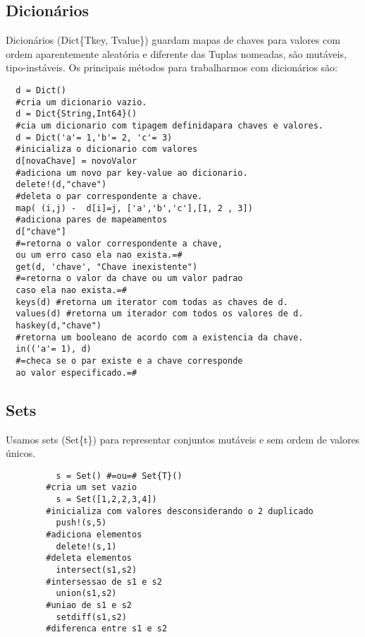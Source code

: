 \subsection{Dicionários}
Dicionários (Dict\{Tkey, Tvalue\}) guardam mapas de chaves para valores com ordem aparentemente aleatória e diferente das Tuplas nomeadas, são mutáveis, tipo-instáveis.
Os principais métodos para trabalharmos com dicionários são:
\begin{lstlisting}
  d = Dict() 
  #cria um dicionario vazio.
  d = Dict{String,Int64}() 
  #cia um dicionario com tipagem definidapara chaves e valores.
  d = Dict('a'= 1,'b'= 2, 'c'= 3) 
  #inicializa o dicionario com valores
  d[novaChave] = novoValor 
  #adiciona um novo par key-value ao dicionario.
  delete!(d,"chave") 
  #deleta o par correspondente a chave.
  map( (i,j) -  d[i]=j, ['a','b','c'],[1, 2 , 3]) 
  #adiciona pares de mapeamentos
  d["chave"] 
  #=retorna o valor correspondente a chave, 
  ou um erro caso ela nao exista.=#
  get(d, 'chave', "Chave inexistente") 
  #=retorna o valor da chave ou um valor padrao 
  caso ela nao exista.=# 
  keys(d) #retorna um iterator com todas as chaves de d.
  values(d) #retorna um iterador com todos os valores de d.
  haskey(d,"chave") 
  #retorna um booleano de acordo com a existencia da chave.
  in(('a'= 1), d) 
  #=checa se o par existe e a chave corresponde 
  ao valor especificado.=#

\end{lstlisting}

\subsection{Sets}
Usamos sets (Set\{t\}) para representar conjuntos mutáveis e sem ordem de valores únicos.
    \begin{lstlisting}
          s = Set() #=ou=# Set{T}() 
        #cria um set vazio
          s = Set([1,2,2,3,4]) 
        #inicializa com valores desconsiderando o 2 duplicado
          push!(s,5) 
        #adiciona elementos
          delete!(s,1)
        #deleta elementos
          intersect(s1,s2) 
        #intersessao de s1 e s2
          union(s1,s2) 
        #uniao de s1 e s2
          setdiff(s1,s2) 
        #diferenca entre s1 e s2
    \end{lstlisting}

